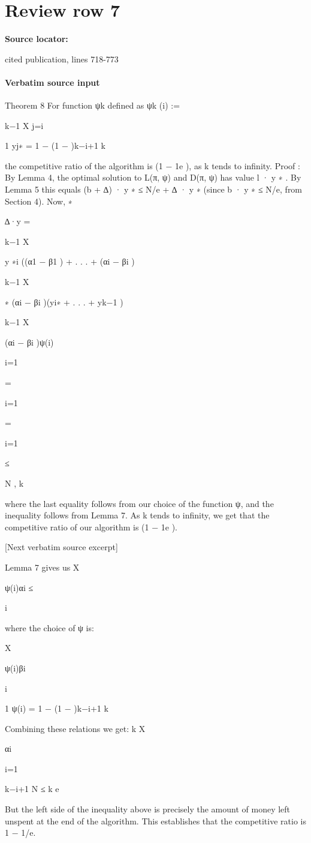 \documentclass[10pt]{article}
\begin{document}
\section*{Review row 7}
\textbf{Source locator:} {\footnotesize\raggedright cited publication, lines 718-\allowbreak{}773\par}
\paragraph{Verbatim source input}
\begin{ReviewVerbatim}
Theorem 8 For function ψk defined as
ψk (i) :=

k−1
X
j=i

1
yj∗ = 1 − (1 − )k−i+1
k

the competitive ratio of the algorithm is (1 − 1e ), as k tends to infinity.
Proof :
By Lemma 4, the optimal solution to L(π, ψ) and D(π, ψ) has value l · y ∗ . By
Lemma 5 this equals (b + ∆) · y ∗ ≤ N/e + ∆ · y ∗ (since b · y ∗ ≤ N/e, from Section 4).
Now,
∗

∆·y =

k−1
X

y ∗i ((α1 − β1 ) + . . . + (αi − βi )

k−1
X

∗
(αi − βi )(yi∗ + . . . + yk−1
)

k−1
X

(αi − βi )ψ(i)

i=1

=

i=1

=

i=1

≤

N
,
k

where the last equality follows from our choice of the function ψ, and the inequality follows
from Lemma 7. As k tends to infinity, we get that the competitive ratio of our algorithm is
(1 − 1e ).

[Next verbatim source excerpt]

Lemma 7 gives us
X

ψ(i)αi ≤

i

where the choice of ψ is:

X

ψ(i)βi

i

1
ψ(i) = 1 − (1 − )k−i+1
k

Combining these relations we get:
k
X

αi

i=1

k−i+1
N
≤
k
e

But the left side of the inequality above is precisely the amount of money left unspent at the
end of the algorithm. This establishes that the competitive ratio is 1 − 1/e.
\end{ReviewVerbatim}
\end{document}
